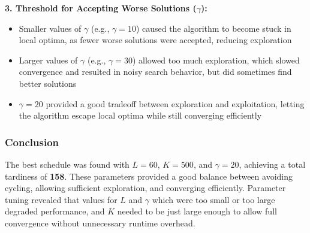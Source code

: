 \documentclass[fleqn]{article}
\begin{document}
    \textbf{3. Threshold for Accepting Worse Solutions ($\gamma$):}
    \begin{itemize}
        \item Smaller values of $\gamma$ (e.g., $\gamma=10$) caused the algorithm to become stuck in local optima, as fewer worse solutions were accepted, reducing exploration
        \item Larger values of $\gamma$ (e.g., $\gamma=30$) allowed too much exploration, which slowed convergence and resulted in noisy search behavior, but did sometimes find better solutions
        \item $\gamma=20$ provided a good tradeoff between exploration and exploitation, letting the algorithm escape local optima while still converging efficiently
    \end{itemize}

    \subsubsection*{Conclusion}
    The best schedule was found with $L=60$, $K=500$, and $\gamma=20$, achieving a total tardiness of \textbf{158}. These parameters provided a good balance between avoiding cycling, allowing sufficient exploration, and converging efficiently. Parameter tuning revealed that values for $L$ and $\gamma$ which were too small or too large degraded performance, and $K$ needed to be just large enough to allow full convergence without unnecessary runtime overhead.
\end{document}
